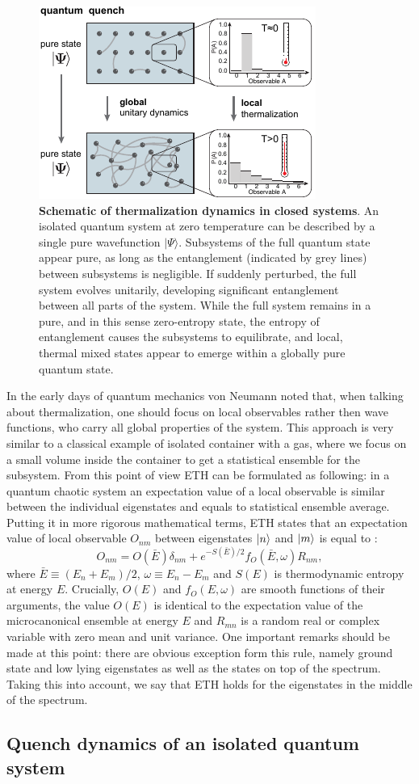  \begin{figure}[t]
	\centering
	\includegraphics[scale=2]{figures/ETH_fig1.pdf}
	\caption{{\bf Schematic of thermalization dynamics in closed systems}.  An isolated quantum system at zero temperature can be described by a single pure wavefunction $\vert \Psi \rangle$. Subsystems of the full quantum state appear pure, as long as the entanglement (indicated by grey lines) between subsystems is negligible. If suddenly perturbed, the full system evolves unitarily, developing significant entanglement between all parts of the system. While the full system remains in a pure, and in this sense zero-entropy state, the entropy of entanglement causes the subsystems to equilibrate, and local, thermal mixed states appear to emerge within a globally pure quantum state.  }
	\label{fig:conceptual}
\end{figure}

In the early days of quantum mechanics von Neumann noted that, when talking about thermalization, one should focus on local observables rather then wave functions, who carry all global properties of the system. This approach is very similar to a classical example of isolated container with a gas, where we focus on a small volume inside the container to get a statistical ensemble for the subsystem. From this point of view ETH can be formulated as following: in a quantum chaotic system an expectation value of a local observable is similar between the individual eigenstates and equals to statistical ensemble average. Putting it in more rigorous mathematical terms, ETH states that an expectation value of local observable $O_{nm}$ between eigenstates $|n\rangle$ and $|m\rangle$ is equal to \cite{Srednicki1999}: 
\begin{equation}
O_{nm} = O(\bar{E}) \delta_{nm} + e^{-S(\bar{E})/2} f_O (\bar{E}, \omega) R_{nm},
\end{equation}
where $\bar{E} \equiv (E_n+E_m)/2$, $\omega \equiv E_n-E_m$ and $S(E)$ is thermodynamic entropy at energy $E$. Crucially, $O(E)$ and $f_O(E,ω)$ are smooth functions of their arguments, the value $O(E)$ is identical to the expectation value of the microcanonical ensemble at energy $E$ and $R_{mn}$ is a random real or complex variable with zero mean and unit variance. One important remarks should be made at this point: there are obvious exception form this rule, namely ground state and low lying eigenstates as well as the states on top of the spectrum. Taking this into account, we say that ETH holds for the eigenstates in the middle of the spectrum. 

\subsection{Quench dynamics of an isolated quantum system}
